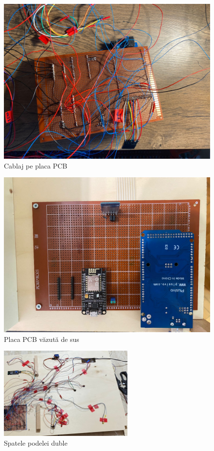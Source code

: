 \begin{figure}[H]
\includegraphics[angle=90,width=0.7\linewidth]{bachelors_ro/images/cablaj_pcb.jpg}
\caption{Cablaj pe placa PCB}
\label{fig:cablaj_pcb}
\end{figure}

\begin{figure}
    \centering
    \includegraphics[angle=90,width=0.7\linewidth]{bachelors_ro/images/pcb_fata.jpg}
    \caption{Placa PCB văzută de sus}
    \label{fig:pcb_fata}
\end{figure}

\begin{figure}[H]
\includegraphics[width=0.6\textwidth, height=0.4\textwidth]{bachelors_ro/images/podea_dubla.jpg}
\caption{Spatele podelei duble }
\label{fig:podea_dubla}
\end{figure}

